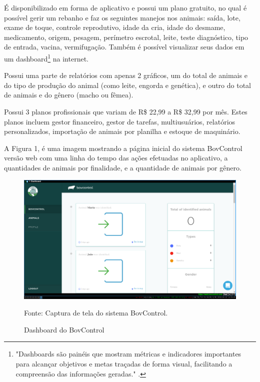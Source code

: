 É disponibilizado em forma de aplicativo e possui um plano gratuito, no qual é possível gerir um rebanho e faz os seguintes manejos nos animais: saída, lote, exame de toque, controle reprodutivo, idade da cria, idade do desmame, medicamento, origem, pesagem, perímetro escrotal, leite, teste diagnóstico, tipo de entrada, vacina, vermifugação. Também é possível visualizar seus dados em um dashboard\footnote{"Dashboards são painéis que mostram métricas e indicadores importantes para alcançar objetivos e metas traçadas de forma visual, facilitando a compreensão das informações geradas." \cite{nascimento17}.} na internet.

Possui uma parte de relatórios com apenas 2 gráficos, um do total de animais e do tipo de produção do animal (como leite, engorda e genética), e outro do total de animais e do gênero (macho ou fêmea).

Possui 3 planos profissionais que variam de R\$ 22,99 a R\$ 32,99 por mês. Estes planos incluem gestor financeiro, gestor de tarefas, multiusuários, relatórios personalizados, importação de animais por planilha e estoque de maquinário.

A Figura 1, é uma imagem mostrando a página inicial do sistema BovControl versão web com uma linha do tempo das ações efetuadas no aplicativo, a quantidades de animais por finalidade, e a quantidade de animais por gênero.

\begin{figure}[H]
	\begin{center}
		\caption{Dashboard do BovControl}
		\includegraphics[width=\textwidth]{../img/bovcontrol.png}

		Fonte: Captura de tela do sistema BovControl.
	\end{center}
\end{figure}


